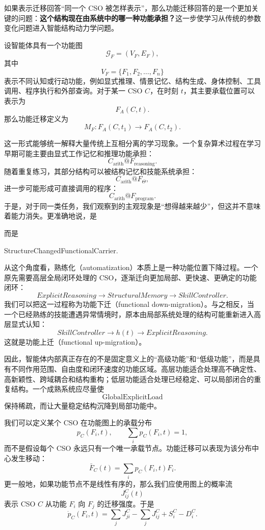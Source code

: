 如果表示迁移回答“同一个 CSO 被怎样表示”，那么功能迁移回答的是一个更加关键的问题：\textbf{这个结构现在由系统中的哪一种功能承担？}这一步使学习从传统的参数变化问题进入智能结构动力学问题。

设智能体具有一个功能图
\[
\mathcal G_F
=
(V_F,E_F),
\]
其中
\[
V_F
=
\{F_1,F_2,\ldots,F_n\}
\]
表示不同认知或行动功能，例如显式推理、情景记忆、结构生成、身体控制、工具调用、程序执行和外部查询。对于某一 CSO $C$，在时刻 $t$，其主要承载位置可以表示为
\[
F_A(C,t).
\]
那么功能迁移定义为
\[
M_F:
F_A(C,t_1)
\longrightarrow
F_A(C,t_2).
\]

这一形式能够统一解释大量传统上互相分离的学习现象。一个复杂算术过程在学习早期可能主要由显式工作记忆和推理功能承担：
\[
C_{\mathrm{arith}}
@F_{\mathrm{reasoning}}.
\]
随着重复练习，其部分结构可以被结构记忆和技能系统承担：
\[
C_{\mathrm{arith}}
@F_{\Theta},
\]
进一步可能形成可直接调用的程序：
\[
C_{\mathrm{arith}}
@F_{\mathrm{program}}.
\]
于是，对于同一类任务，我们观察到的主观现象是“想得越来越少”，但这并不意味着能力消失。更准确地说，是
\begin{statementbox}
\centering
{}
\end{statementbox}
而是
\begin{statementbox}
StructureChangedFunctionalCarrier.
\end{statementbox}

从这个角度看，熟练化（automatization）本质上是一种功能位置下降过程。一个原先需要高层全局闭环处理的 CSO，逐渐迁向更加局部、更快速、更确定的功能闭环：
\[
ExplicitReasoning
\rightarrow
StructuralMemory
\rightarrow
SkillController.
\]
我们可以把这一过程称为功能下迁（functional down-migration）。与之相反，当一个已经熟练的技能遭遇异常情境时，原本由局部系统处理的结构可能重新进入高层显式认知：
\[
SkillController
\rightarrow
h(t)
\rightarrow
ExplicitReasoning.
\]
这就是功能上迁（functional up-migration）。

因此，智能体内部真正存在的不是固定意义上的“高级功能”和“低级功能”，而是具有不同作用范围、自由度和闭环速度的功能区域。高层功能适合处理高不确定性、高新颖性、跨域耦合和结构重构；低层功能适合处理已经稳定、可以局部闭合的重复结构。一个成熟系统应尽量使
\[
\text{GlobalExplicitLoad}
\]
保持稀疏，而让大量稳定结构沉降到局部功能中。

我们可以定义某个 CSO 在功能图上的承载分布
\[
p_C(F_i,t),
\qquad
\sum_i p_C(F_i,t)=1,
\]
而不是假设每个 CSO 永远只有一个唯一承载节点。功能迁移可以表现为该分布中心发生移动：
\[
\bar F_C(t)
=
\sum_i p_C(F_i,t)F_i.
\]
更一般地，如果功能节点不是线性有序的，那么我们应使用图上的概率流
\[
J^{C}_{ij}(t)
\]
表示 CSO $C$ 从功能 $F_i$ 向 $F_j$ 的迁移强度。于是
\[
\dot p_C(F_i,t)
=
\sum_j J^C_{ji}
-
\sum_j J^C_{ij}
+
S_i^C
-
D_i^C.
\]

